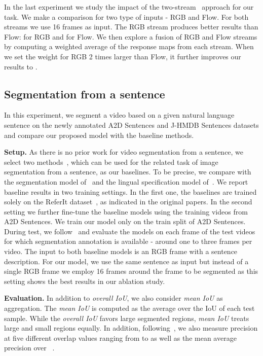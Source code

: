 In the last experiment we study the impact of the two-stream~\cite{SimonyanNIPS2014} approach for our task. We make a comparison for two type of inputs - RGB and Flow. For both streams we use 16 frames as input. The RGB stream produces better results than Flow:  for RGB and  for Flow. We then explore a fusion of RGB and Flow streams by computing a weighted average of the response maps from each stream. When we set the weight for RGB 2 times larger than Flow, it further improves our results to .


\subsection{Segmentation from a sentence}
\label{sec:experiments:actoraction}
In this experiment, we segment a video based on a given natural language sentence on the newly annotated A2D Sentences and J-HMDB Sentences datasets and compare our proposed model with the baseline methods.

\textbf{Setup.} As there is no prior work for video segmentation from a sentence, we select two methods~\cite{hu2016segmentation, li2017tracking}, which can be used for the related task of image segmentation from a sentence, as our baselines. To be precise, we compare with the segmentation model of~\cite{hu2016segmentation} and the lingual specification model of~\cite{li2017tracking}. We report baseline results in two training settings. In the first one, the baselines are trained solely on the ReferIt dataset~\cite{sahar2014referit}, as indicated in the original papers. In the second setting we further fine-tune the baseline models using the training videos from A2D Sentences. We train our model only on the train split of A2D Sentences. During test, we follow~\cite{xu2015fly} and evaluate the models on each frame of the test videos for which segmentation annotation is available - around one to three frames per video. The input to both baseline models is an RGB frame with a sentence description. For our model, we use the same sentence as input but instead of a single RGB frame we employ 16 frames around the frame to be segmented as this setting shows the best results in our ablation study.

\textbf{Evaluation.} In addition to \textit{overall IoU}, we also consider \textit{mean IoU} as aggregation. The \textit{mean IoU} is computed as the average over the IoU of each test sample.
While the \textit{overall IoU} favors large segmented regions, \textit{mean IoU} treats large and small regions equally. In addition, following~\cite{hu2016segmentation,li2017tracking}, we also measure precision at five different overlap values ranging from  to  as well as the mean average precision over ~\cite{lin2014microsoft}.


